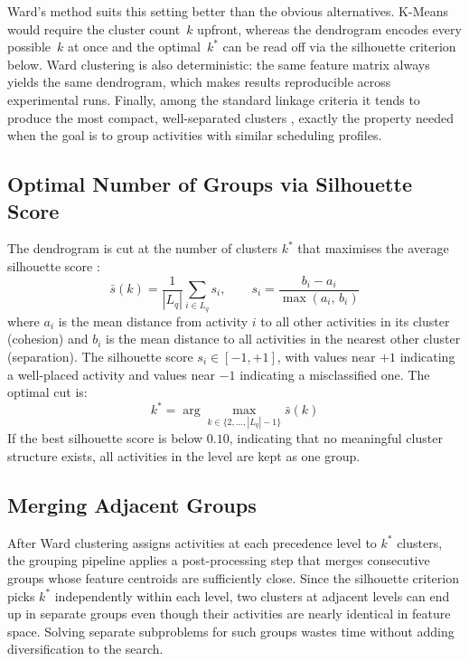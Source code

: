 Ward's method suits this setting better than the obvious
alternatives. K-Means \parencite{MacQueen1967} would require
the cluster count~$k$ upfront, whereas the dendrogram encodes
every possible~$k$ at once and the optimal~$k^*$ can be read
off via the silhouette criterion below. Ward clustering is also
deterministic: the same feature matrix always yields the same
dendrogram, which makes results reproducible across
experimental runs. Finally, among the standard linkage criteria
it tends to produce the most compact, well-separated clusters
\parencite{Murtagh2012}, exactly the property needed when the
goal is to group activities with similar scheduling profiles.


\subsection{Optimal Number of Groups via Silhouette Score}
\label{subsec:silhouette}
The dendrogram is cut at the number of clusters $k^*$ that maximises
the average silhouette score \parencite{rousseeuw1987}:
\begin{equation}
    \bar{s}(k) = \frac{1}{|L_q|} \sum_{i \in L_q} s_i,
    \qquad
    s_i = \frac{b_i - a_i}{\max(a_i,\, b_i)}
    \label{eq:silhouette}
\end{equation}
where $a_i$ is the mean distance from activity $i$ to all other
activities in its cluster (cohesion) and $b_i$ is the mean distance
to all activities in the nearest other cluster (separation). The
silhouette score $s_i \in [-1, +1]$, with values near $+1$
indicating a well-placed activity and values near $-1$ indicating
a misclassified one. The optimal cut is:
\begin{equation}
    k^* = \arg\max_{k \in \{2, \ldots, |L_q|-1\}} \bar{s}(k)
    \label{eq:kstar}
\end{equation}
If the best silhouette score is below $0.10$, indicating that no
meaningful cluster structure exists, all activities in the level
are kept as one group.

\subsection{Merging Adjacent Groups}
\label{subsec:merge}
After Ward clustering assigns activities at each precedence
level to $k^*$ clusters, the grouping pipeline applies a
post-processing step that merges consecutive groups whose
feature centroids are sufficiently close. Since the silhouette
criterion picks $k^*$ independently within each level, two
clusters at adjacent levels can end up in separate groups even
though their activities are nearly identical in feature space.
Solving separate subproblems for such groups wastes time
without adding diversification to the search.

